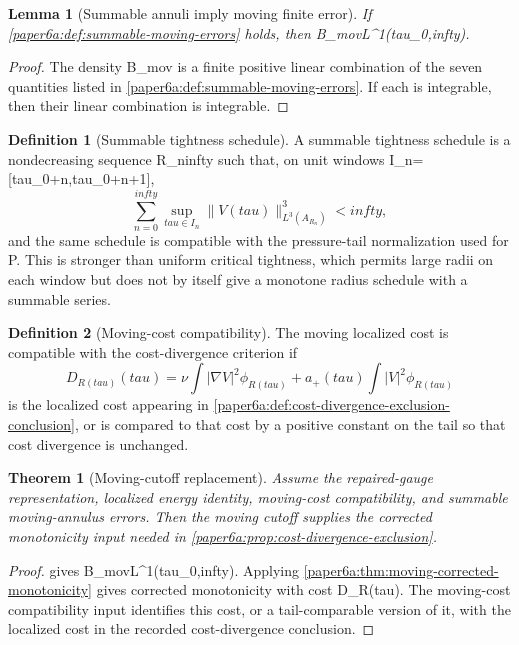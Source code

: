 \documentclass[11pt]{amsart}
\def\({}%
\def\){}%
\def\tilde#1{#1}%
\def\mathfrak#1{#1}%
\def\mathrm#1{#1}%
\def\tau{tau}%
\def\infty{infty}%
\theoremstyle{plain}
\newtheorem{theorem}{Theorem}[section]
\newtheorem{lemma}[lemma]{Lemma}
\theoremstyle{definition}
\newtheorem{definition}[definition]{Definition}
\theoremstyle{remark}
\begin{document}
\begin{lemma}[Summable annuli imply moving finite error]
\label{paper6a:lem:summable-moving-errors}
If \cref{paper6a:def:summable-moving-errors} holds, then
\(B_{\mathrm{mov}}\in L^1(\tau_0,\infty)\).
\end{lemma}

\begin{proof}
The density \(B_{\mathrm{mov}}\) is a finite positive linear combination of
the seven quantities listed in
\cref{paper6a:def:summable-moving-errors}.  If each is integrable, then their
linear combination is integrable.
\end{proof}

\begin{definition}[Summable tightness schedule]\label{paper6a:def:summable-tightness}
A summable tightness schedule is a nondecreasing sequence \(R_n\to\infty\) such
that, on unit windows \(I_n=[\tau_0+n,\tau_0+n+1]\),
\[
  \sum_{n=0}^{\infty}
  \sup_{\tau\in I_n}
  \|V(\tau)\|_{L^3(A_{R_n})}^3<\infty,
\]
and the same schedule is compatible with the pressure-tail normalization used
for \(P\).  This is stronger than uniform critical tightness, which permits
large radii on each window but does not by itself give a monotone radius
schedule with a summable series.
\end{definition}

\begin{definition}[Moving-cost compatibility]\label{paper6a:def:moving-cost-compatibility}
The moving localized cost is compatible with the cost-divergence criterion if
\[
  \tilde{\mathfrak D}_{R(\tau)}(\tau)
  =
  \nu\int|\nabla V|^2\phi_{R(\tau)}
  +a_+(\tau)\int|V|^2\phi_{R(\tau)}
\]
is the localized cost appearing in
\cref{paper6a:def:cost-divergence-exclusion-conclusion}, or is compared to that cost by a
positive constant on the tail so that cost divergence is unchanged.
\end{definition}

\begin{theorem}[Moving-cutoff replacement]\label{paper6a:thm:moving-replacement}
Assume the repaired-gauge representation, localized energy identity,
moving-cost compatibility, and summable moving-annulus errors.  Then the moving
cutoff supplies the corrected monotonicity input needed in
\cref{paper6a:prop:cost-divergence-exclusion}.
\end{theorem}

\begin{proof}
 gives
\(B_{\mathrm{mov}}\in L^1(\tau_0,\infty)\).  Applying
\cref{paper6a:thm:moving-corrected-monotonicity} gives corrected monotonicity
with cost \(\tilde{\mathfrak D}_{R(\tau)}\).  The moving-cost compatibility
input identifies this cost, or a tail-comparable version of it, with the
localized cost in the recorded cost-divergence conclusion.
\end{proof}
\end{document}
